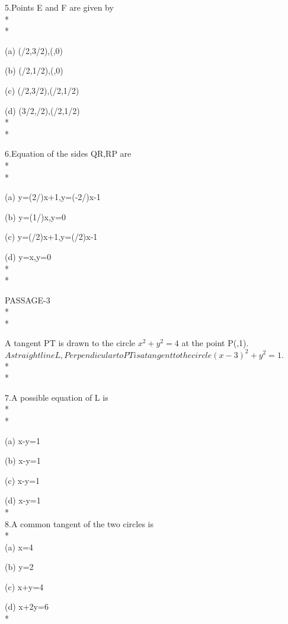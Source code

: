 \documentclass{article}
\begin{document}
5.Points E and F are given by\\*\\*

\choice (a) (/2,3/2),(,0)

\choice (b) (/2,1/2),(,0)

\choice (c) (/2,3/2),(/2,1/2)

\choice (d) (3/2,/2),(/2,1/2) \\*\\*

6.\enspace Equation of the sides QR,RP are\\*\\*

\choice (a) y=(2/)x+1,y=(-2/)x-1

\choice (b) y=(1/)x,y=0

\choice (c) y=(/2)x+1,y=(/2)x-1

\choice (d) y=x,y=0\\*\\*

{\LARGE PASSAGE-3}\\*\\*

 A tangent PT is drawn to the circle $x^2+y^2=4$ at the point P(,1).\enspace$A straight line L,Perpendicular to PT is a tangent to the circle(x-3)^2+y^2=1.$\\*\\*

7.A possible equation of L is \\*\\*

\choice (a) x-y=1

\choice (b) x-y=1

\choice (c) x-y=1

\choice (d) x-y=1\\*\\

8.\enspace A common tangent of the two circles is\\*\\

\choice (a) x=4

\choice (b) y=2

\choice (c) x+y=4

\choice (d) x+2y=6\\*\\
\end{document}

